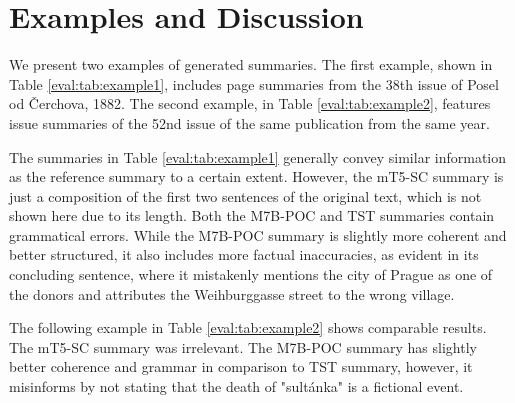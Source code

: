 \documentclass[english, ba, kiv, he, iso690numb, pdf, viewonly]{fasthesis}
\begin{document}
\section{Examples and Discussion}
We present two examples of generated summaries. The first example, shown in Table \ref{eval:tab:example1}, includes page summaries from the 38th issue of Posel od Čerchova, 1882. The second example, in Table \ref{eval:tab:example2}, features issue summaries of the 52nd issue of the same publication from the same year.

The summaries in Table \ref{eval:tab:example1} generally convey similar information as the reference summary to a certain extent. However, the mT5-SC summary is just a composition of the first two sentences of the original text, which is not shown here due to its length. Both the M7B-POC and TST summaries contain grammatical errors. While the M7B-POC summary is slightly more coherent and better structured, it also includes more factual inaccuracies, as evident in its concluding sentence, where it mistakenly mentions the city of Prague as one of the donors and attributes the Weihburggasse street to the wrong village.

The following example in Table \ref{eval:tab:example2} shows comparable results. The mT5-SC summary was irrelevant. The M7B-POC summary has slightly better coherence and grammar in comparison to TST summary, however, it misinforms by not stating that the death of "sultánka" is a fictional event.
\end{document}
